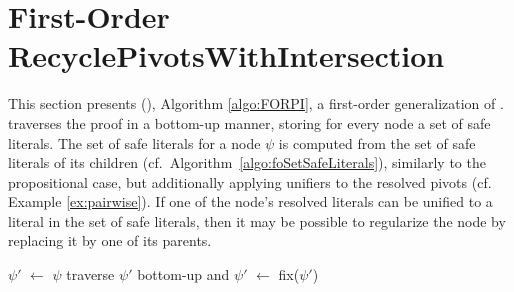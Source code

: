\section{First-Order RecyclePivotsWithIntersection}
\label{sec:FORPI}
\vspace{-0.5cm}
This section presents {\FirstOrderRPI} ({\FORPI}), Algorithm \ref{algo:FORPI}, a first-order generalization of {\RPI}.
{\FORPI} traverses the proof in a bottom-up manner, storing for every node a set of safe literals. The set of safe literals for a node $\psi$ is computed from the set of safe literals of its children (cf.\ Algorithm~\ref{algo:foSetSafeLiterals}), similarly to the propositional case, but additionally applying unifiers to the resolved pivots (cf. Example \ref{ex:pairwise}).
If one of the node's resolved literals can be unified to a literal in the set of safe literals, then it may be possible to regularize the node by replacing it by one of its parents.  


\newcommand{\la}{\leftarrow}
\begin{algorithm}[bt]
\begin{footnotesize}


\BlankLine

$\psi'$ $\la$ $\psi$\;
traverse $\psi'$ bottom-up and 
$\psi'$ $\la$ fix($\psi'$) \;
\;
\caption{\label{algo:FORPI} \texttt{\FORPI}}
\end{footnotesize}
\end{algorithm}


